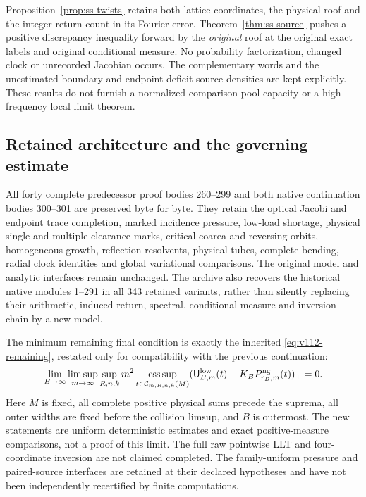 \documentclass[11pt,reqno]{amsart}
\numberwithin{equation}{section}
\theoremstyle{definition}\newtheorem{definition}[theorem]{Definition}
\theoremstyle{remark}\newtheorem{remark}[theorem]{Remark}
\begin{document}
Proposition~\ref{prop:ss-twists} retains both lattice coordinates,
the physical roof and the integer return count in its Fourier error.
Theorem~\ref{thm:ss-source} pushes a positive discrepancy inequality
forward by the \emph{original} roof at the original exact labels and
original conditional measure. No probability factorization, changed
clock or unrecorded Jacobian occurs. The complementary words and the
unestimated boundary and endpoint-deficit source densities are kept
explicitly. These results do not furnish a normalized comparison-pool
capacity or a high-frequency local limit theorem.

\subsection*{Retained architecture and the governing estimate}
All forty complete predecessor proof bodies 260--299 and both native
continuation bodies 300--301 are preserved byte for byte. They retain
the optical Jacobi and endpoint trace completion, marked incidence
pressure, low-load shortage, physical single and multiple clearance
marks, critical coarea and reversing orbits, homogeneous growth,
reflection resolvents, physical tubes, complete bending, radial clock
identities and global variational comparisons. The original model and
analytic interfaces remain unchanged. The archive also recovers the
historical native modules 1--291 in all 343 retained variants, rather
than silently replacing their arithmetic, induced-return, spectral,
conditional-measure and inversion chain by a new model.

The minimum remaining final condition is exactly the inherited
\eqref{eq:v112-remaining}, restated only for compatibility with the
previous continuation:
\begin{equation}\label{eq:sc-original-obligation}
 \lim_{B\to\infty}\limsup_{m\to\infty}\sup_{R,n,k}
 m^2\operatorname*{ess\,sup}_{t\in\mathcal C_{m,R,n,k}(M)}
 (\mathsf U^{\rm low}_{B,m}(t)-K_BP^{\rm ng}_{r_B,m}(t))_+=0.
\end{equation}
Here $M$ is fixed, all complete positive physical sums precede the
suprema, all outer widths are fixed before the collision limsup, and
$B$ is outermost. The new statements are uniform deterministic
estimates and exact positive-measure comparisons, not a proof of this
limit. The full raw pointwise LLT and four-coordinate inversion are
not claimed completed. The family-uniform pressure and paired-source
interfaces are retained at their declared hypotheses and have not
been independently recertified by finite computations.
\end{document}
